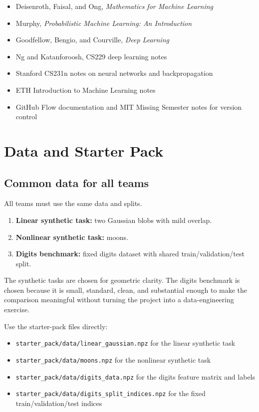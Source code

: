 \documentclass[11pt]{article}
\newcommand{\filepath}[1]{\nolinkurl{#1}}
\begin{document}
\begin{itemize}
    \item Deisenroth, Faisal, and Ong, \emph{Mathematics for Machine Learning} \cite{deisenroth2020}
    \item Murphy, \emph{Probabilistic Machine Learning: An Introduction} \cite{murphy2022}
    \item Goodfellow, Bengio, and Courville, \emph{Deep Learning} \cite{goodfellow2016}
    \item Ng and Katanforoosh, CS229 deep learning notes \cite{ngdeep}
    \item Stanford CS231n notes on neural networks and backpropagation \cite{cs231n_nn,cs231n_backprop}
    \item ETH Introduction to Machine Learning notes \cite{ethml2024}
    \item GitHub Flow documentation and MIT Missing Semester notes for version control \cite{githubflow,missingsemester}
\end{itemize}

\section{Data and Starter Pack}

\subsection{Common data for all teams}

All teams must use the same data and splits.

\begin{enumerate}
    \item \textbf{Linear synthetic task:} two Gaussian blobs with mild overlap.
    \item \textbf{Nonlinear synthetic task:} moons.
    \item \textbf{Digits benchmark:} fixed digits dataset with shared train/validation/test split.
\end{enumerate}

The synthetic tasks are chosen for geometric clarity. The digits benchmark is chosen because it is small, standard, clean, and substantial enough to make the comparison meaningful without turning the project into a data-engineering exercise.

Use the starter-pack files directly:

\begin{itemize}
    \item \filepath{starter_pack/data/linear_gaussian.npz} for the linear synthetic task
    \item \filepath{starter_pack/data/moons.npz} for the nonlinear synthetic task
    \item \filepath{starter_pack/data/digits_data.npz} for the digits feature matrix and labels
    \item \filepath{starter_pack/data/digits_split_indices.npz} for the fixed train/validation/test indices
\end{itemize}
\end{document}
